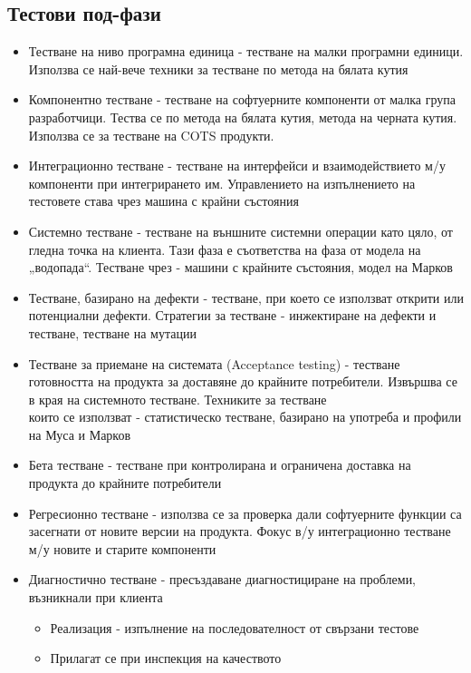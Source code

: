 \documentclass[fleqn,12pt]{article}
\begin{document}
\begin{flushleft}
    \subsection{Тестови под-фази}
        \begin{itemize}
            \item Тестване на ниво програмна единица - тестване на малки програмни единици. Използва се най-вече техники за тестване по метода на бялата кутия
            \item Компонентно тестване - тестване на софтуерните компоненти от малка група разработчици. Тества се по метода на бялата кутия, метода на черната кутия. Използва се за тестване на COTS продукти.
            \item Интеграционно тестване - тестване на интерфейси и взаимодействието м/у компоненти при интегрирането им. Управлението на изпълнението на тестовете става чрез машина с крайни състояния
            \item Системно тестване - тестване на външните системни операции като цяло, от гледна точка на клиента. Тази фаза е съответства на фаза от модела на „водопада``. Тестване чрез - машини с крайните състояния, модел на Марков
            \item Тестване, базирано на дефекти - тестване, при което се използват открити или потенциални дефекти. Стратегии за тестване - инжектиране на дефекти и тестване, тестване на мутации
            \item Тестване за приемане на системата (Acceptance testing) - тестване готовността на продукта за доставяне до крайните потребители. Извършва се в края на системното тестване. Техниките за тестване\\
            които се използват - статистическо тестване, базирано на употреба и профили на Муса и Марков
            \item Бета тестване - тестване при контролирана и ограничена доставка на продукта до крайните потребители
            \item Регресионно тестване - използва се за проверка дали софтуерните функции са засегнати от новите версии на продукта. Фокус в/у интеграционно тестване м/у новите и старите компоненти
            \item Диагностично тестване - пресъздаване диагностициране на проблеми, възникнали при клиента
                \begin{itemize}
                    \item Реализация - изпълнение на последователност от свързани тестове
                    \item Прилагат се при инспекция на качеството
                \end{itemize}
        \end{itemize}


\end{flushleft}
\end{document}
